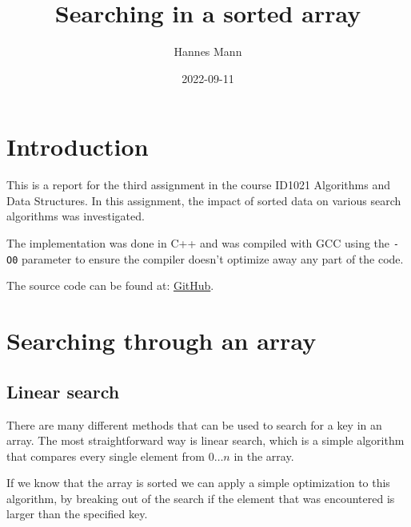 \documentclass[a4paper,11pt]{article}
\begin{document}
\title{
    \textbf{Searching in a sorted array}
}
\author{Hannes Mann}
\date{2022-09-11}

\maketitle

\section*{Introduction}

This is a report for the third assignment in the course ID1021 Algorithms and Data Structures. In this assignment, the impact of sorted data on various search algorithms was investigated.

The implementation was done in C++ and was compiled with GCC using the {\tt -O0} parameter to ensure the compiler doesn't optimize away any part of the code.

The source code can be found at: \href{https://github.com/HannesMann/ID1021/tree/main/src/binary_search}{GitHub}.

\section*{Searching through an array}

\subsection*{Linear search}

There are many different methods that can be used to search for a key in an array. The most straightforward way is linear search, which is a simple algorithm that compares every single element from $0 \dots n$ in the array.

If we know that the array is sorted we can apply a simple optimization to this algorithm, by breaking out of the search if the element that was encountered is larger than the specified key.
\end{document}

